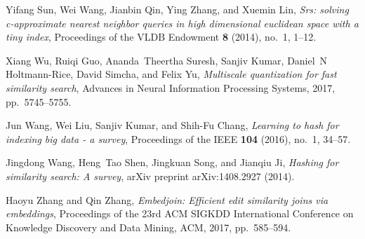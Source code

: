 \documentclass[11pt]{article}
\begin{document}
\begin{thebibliography}{10}
\begin{small}
Yifang Sun, Wei Wang, Jianbin Qin, Ying Zhang, and Xuemin Lin, \emph{Srs: solving c-approximate nearest neighbor queries in high dimensional euclidean space with a tiny index}, Proceedings of the VLDB Endowment \textbf{8} (2014), no.~1, 1--12.

Xiang Wu, Ruiqi Guo, Ananda~Theertha Suresh, Sanjiv Kumar, Daniel~N Holtmann-Rice, David Simcha, and Felix Yu, \emph{Multiscale quantization for fast similarity search}, Advances in Neural Information Processing Systems, 2017, pp.~5745--5755.

Jun Wang, Wei Liu, Sanjiv Kumar, and Shih-Fu Chang, \emph{Learning to hash for indexing big data - a survey}, Proceedings of the IEEE \textbf{104} (2016), no.~1, 34--57.

Jingdong Wang, Heng~Tao Shen, Jingkuan Song, and Jianqiu Ji, \emph{Hashing for similarity search: A survey}, arXiv preprint arXiv:1408.2927 (2014).

Haoyu Zhang and Qin Zhang, \emph{Embedjoin: Efficient edit similarity joins via embeddings}, Proceedings of the 23rd ACM SIGKDD International Conference on Knowledge Discovery and Data Mining, ACM, 2017, pp.~585--594.
\end{small}
\end{thebibliography}
\end{document}
